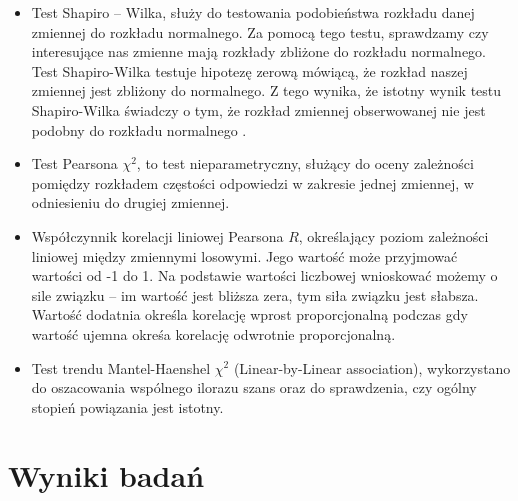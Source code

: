 \documentclass[a4paper,12pt,twoside,openright]{mwrep}
\begin{document}
\begin{itemize}
     \item Test Shapiro – Wilka, służy do testowania podobieństwa rozkładu danej zmiennej do rozkładu normalnego. Za pomocą tego testu, sprawdzamy czy interesujące nas zmienne mają rozkłady zbliżone do rozkładu normalnego. Test Shapiro-Wilka testuje hipotezę zerową mówiącą, że rozkład naszej zmiennej jest zbliżony do normalnego. Z tego wynika, że istotny wynik testu Shapiro-Wilka świadczy o tym, że rozkład zmiennej obserwowanej nie jest podobny do rozkładu normalnego \cite{ShapWilk}. 
    
     \item Test Pearsona $\chi^2$, to test nieparametryczny, służący do oceny zależności pomiędzy rozkładem częstości odpowiedzi w zakresie jednej zmiennej, w odniesieniu do drugiej zmiennej.
     
     \item Współczynnik korelacji liniowej Pearsona $R$, określający poziom zależności liniowej między zmiennymi losowymi. Jego wartość może przyjmować wartości od -1 do 1. Na podstawie wartości liczbowej wnioskować możemy o sile związku – im wartość jest bliższa zera, tym siła związku jest słabsza. Wartość dodatnia określa korelację wprost proporcjonalną podczas gdy wartość ujemna okreśa korelację odwrotnie proporcjonalną.
     
     \item Test trendu Mantel-Haenshel $\chi^2$ (Linear-by-Linear association)\cite{mantel}, wykorzystano do oszacowania wspólnego ilorazu szans oraz do sprawdzenia, czy ogólny stopień powiązania jest istotny.
     
%    
     
\end{itemize}



\chapter*{Wyniki badań}
\end{document}
